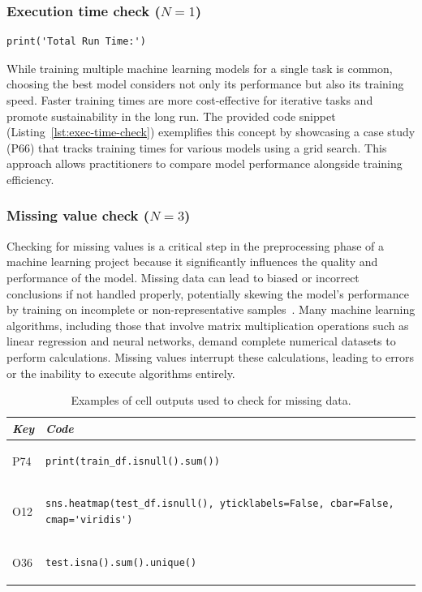 \subsubsection{Execution time check ($N = 1$)}

\begin{lstlisting}
print('Total Run Time:')
\end{lstlisting}

While training multiple machine learning models for a single task is common, choosing the best model considers not only its performance but also its training speed. Faster training times are more cost-effective for iterative tasks and promote sustainability in the long run. The provided code snippet (Listing~\ref{lst:exec-time-check}) exemplifies this concept by showcasing a case study (P66) that tracks training times for various models using a grid search. This approach allows practitioners to compare model performance alongside training efficiency. 

\subsubsection{Missing value check ($N = 3$)}

Checking for missing values is a critical step in the preprocessing phase of a machine learning project because it significantly influences the quality and performance of the model. Missing data can lead to biased or incorrect conclusions if not handled properly, potentially skewing the model's performance by training on incomplete or non-representative samples~\cite{shome2022data}. Many machine learning algorithms, including those that involve matrix multiplication operations such as linear regression and neural networks, demand complete numerical datasets to perform calculations. Missing values interrupt these calculations, leading to errors or the inability to execute algorithms entirely.

\begin{table}
\centering
\caption{Examples of cell outputs used to check for missing data.}
\begin{tabular}{@{}m{} m{}@{}}
\toprule
\emph{\textbf{Key}}&
\emph{\textbf{Code}}\\
\midrule

P74&
\begin{lstlisting}
print(train_df.isnull().sum())
\end{lstlisting}\\

O12&
\begin{lstlisting}
sns.heatmap(test_df.isnull(), yticklabels=False, cbar=False, cmap='viridis')
\end{lstlisting}\\

O36&
\begin{lstlisting}
test.isna().sum().unique()
\end{lstlisting}\\
\end{tabular}
\label{tab:missing-value}
\end{table}

